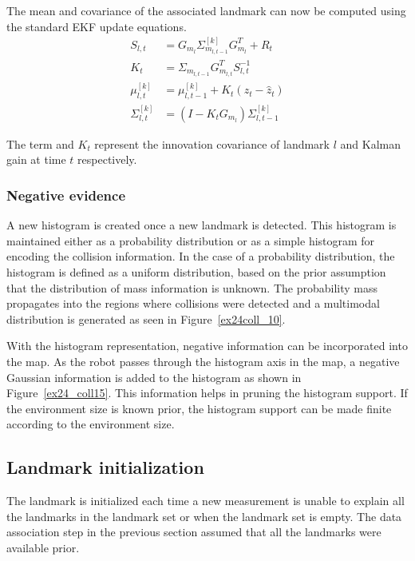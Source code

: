 The mean and covariance of the associated landmark can now be computed using the standard EKF update equations.
\begin{align}
S_{l,t} &= G_{m_l}\Sigma^{[k]}_{m_{l,t-1}}G^T_{m_l}+R_t \label{ekf_update1}\\ 
K_t &= \Sigma_{m_{l,t-1}}G^T_{m_{l,t}}S^{-1}_{l,t} \\
\mu^{[k]}_{l,t} &= \mu^{[k]}_{l,t-1} + K_t\left(z_t-\hat{z}_t\right) \\
\Sigma^{[k]}_{l,t} &= \left(I-K_tG_{m_l}\right)\Sigma^{[k]}_{l,t-1} \label{ekf_update2}
\end{align}

The term  and $K_t$ represent the innovation covariance of landmark $l$ and Kalman gain at time $t$ respectively.

\subsubsection{Negative evidence}
A new histogram is created once a new landmark is detected. This histogram is maintained either as a probability distribution or as a simple histogram for encoding the collision information. In the case of a probability distribution, the histogram is defined as a uniform distribution, based on the prior assumption that the distribution of mass information is unknown. The probability mass propagates into the regions where collisions were detected and a multimodal distribution is generated as seen in Figure~\ref{ex24coll_10}.

With the histogram representation, negative information can be incorporated into the map. As the robot passes through the histogram axis in the map, a negative Gaussian information is added to the histogram as shown in Figure~\ref{ex24_coll15}. This information helps in pruning the histogram support. If the environment size is known prior, the histogram support can be made finite according to the environment size.

\subsection{Landmark initialization}
The landmark is initialized each time a new measurement is unable to explain all the landmarks in the landmark set or when the landmark set is empty. The data association step in the previous section assumed that all the landmarks were available prior.

